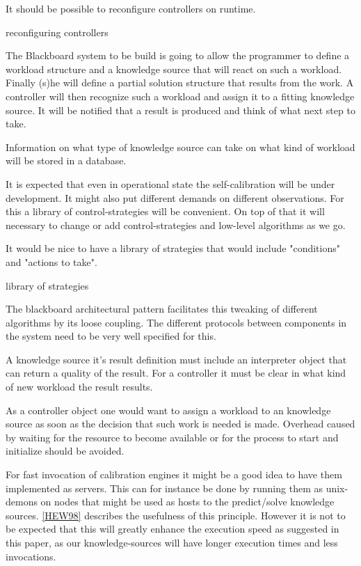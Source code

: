 \documentclass[]{lofar}
\begin{document}
    \begin{requirement}
      It should be possible to reconfigure controllers on runtime.
      \caption{reconfiguring controllers\label{req:reconfigure-controllers}}
    \end{requirement}

    The Blackboard system to be build is going to allow the programmer
    to define a workload structure and a knowledge source that will
    react on such a workload. Finally (s)he will define a partial
    solution structure that results from the work. A controller will
    then recognize such a workload and assign it to a fitting
    knowledge source. It will be notified that a result is produced
    and think of what next step to take.

    Information on what type of knowledge source can take on what kind
    of workload will be stored in a database.

    It is expected that even in operational state the self-calibration
    will be under development. It might also put different demands on
    different observations. For this a library of control-strategies
    will be convenient. On top of that it will necessary to change or
    add control-strategies and low-level algorithms as we go.

    \begin{requirement}
      It would be nice to have a library of strategies that
      would include "conditions" and "actions to
      take".
      \caption{library of strategies\label{req:strategies}}
    \end{requirement}

    The blackboard architectural pattern facilitates this tweaking of
    different algorithms by its loose coupling. The different
    protocols between components in the system need to be very well
    specified for this.

    A knowledge source it's result definition must include an
    interpreter object that can return a quality of the result. For a
    controller it must be clear in what kind of new workload the
    result results.

    As a controller object one would want to assign a workload to an
    knowledge source as soon as the decision that such work is needed
    is made. Overhead caused by waiting for the resource to become
    available or for the process to start and initialize should be
    avoided.

    For fast invocation of calibration engines it might be a good
    idea to have them implemented as servers. This can for instance be
    done by running them as unix-demons on nodes that might be used as
    hosts to the predict/solve knowledge
    sources. \hyperlink{bib:Efficiency}{[HEW98]} describes the
    usefulness of this principle. However it is not to be expected
    that this will greatly enhance the execution speed as suggested in
    this paper, as our knowledge-sources will have longer execution
    times and less invocations.
\end{document}
